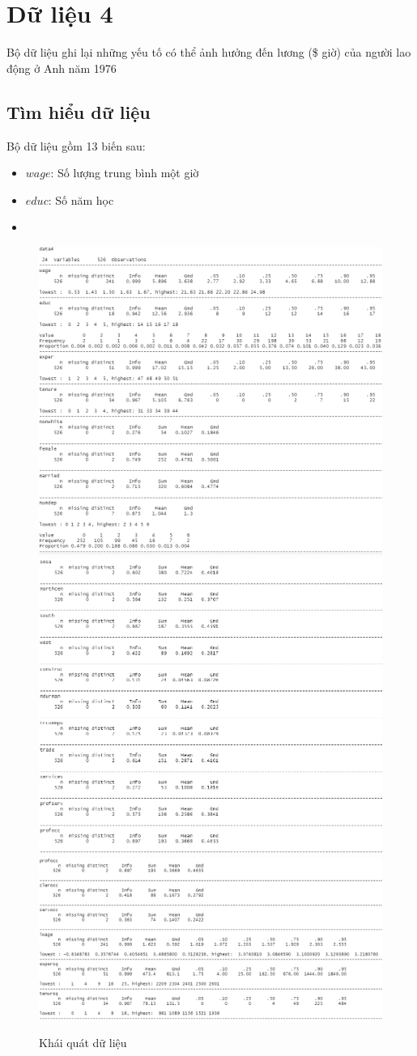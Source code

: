 
\section{Dữ liệu 4}
Bộ dữ liệu ghi lại những yếu tố có thể ảnh hưởng đến lương (\$ giờ) của người lao động ở Anh năm 1976

\subsection*{Tìm hiểu dữ liệu}
Bộ dữ liệu gồm 13 biến sau:
\begin{itemize}
	\item $wage$: Số lượng trung bình một giờ
	\item $educ$: Số năm học
	\item 
\end{itemize}

\begin{figure}
	\centering
	{\includegraphics[width=0.63\linewidth]{../Photo Of Result/describe(4)-1}}
	{\includegraphics[width=0.63\linewidth]{../Photo Of Result/describe(4)-2}}
	{\includegraphics[width=0.63\linewidth]{../Photo Of Result/describe(4)-3}}
	\caption{Khái quát dữ liệu}
	\label{describe-4}
\end{figure}

